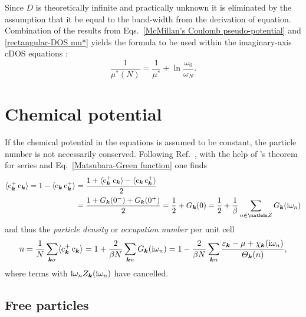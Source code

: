 Since $D$ is theoretically infinite and practically unknown it is eliminated by
the assumption that it be equal to the band-width from the derivation of
 equation. Combination of the results from Eqs.~\ref{McMillan's
Coulomb pseudo-potential} and \ref{rectangular-DOS mu*} yields the formula to be
used within the imaginary-axis cDOS  equations
\cite[Eq.~13]{AllenDynes75}:
%
\begin{equation*}
    \frac 1 {\mu^*(N)} = \frac 1 {\mu^*} + \ln \frac{\omega_0}{\omega_N}.
\end{equation*}

\section{Chemical potential}
\label{chemical potential}

If the chemical potential in the  equations is assumed to be
constant, the particle number is not necessarily conserved. Following
Ref.~, with the help of
's theorem for  series and
Eq.~\ref{Matsubara-Green function} one finds
%
\begin{align*}
    \av{\op c_{\vec k}^+ \, \op c_{\vec k}}
    = 1 - \av{\op c_{\vec k} \, \op c_{\vec k}^+}
    &= \frac { 1
        + \av{\op c_{\vec k}^+ \, \op c_{\vec k}}
        - \av{\op c_{\vec k} \, \op c_{\vec k}^+}
        } 2
    \\
    &= \frac {1 + G_{\vec k}(0^-) + G_{\vec k}(0^+)} 2
    = \frac 1 2 + G_{\vec k}(0)
    = \frac 1 2 + \frac 1 \beta \sum_{n \in \mathds Z} G_{\vec k}(\I \omega_n)
\end{align*}
%
and thus the \emph{particle density} or \emph{occupation number} per unit cell
%
\begin{equation*}
    n = \frac 1 N \sum_{\boldsymbol k \sigma} \langle\mathrm c_{\boldsymbol k}^+ \, \mathrm c_{\boldsymbol k}\rangle
    = 1 + \frac 2 {\beta N} \sum_{\boldsymbol k n} G_{\boldsymbol k}(\mathrm i \omega_n)
    = 1 - \frac 2 {\beta N} \sum_{\boldsymbol k n} \frac
        {\varepsilon_{\boldsymbol k} - \mu + \chi_{\boldsymbol k}(\mathrm i \omega_n)}
        {\varTheta_{\boldsymbol k}(n)},
\end{equation*}
%
where terms with $\mathrm i \omega_n Z_{\boldsymbol k}(\mathrm i \omega_n)$ have cancelled.

\subsection{Free particles}

